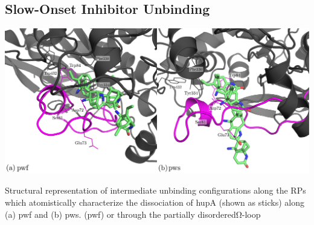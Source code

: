 \documentclass[a0,portrait]{a0poster}
\begin{document}
\begin{multicols}{2}
\section*{\huge\centering\color{myblue}Slow-Onset Inhibitor Unbinding~\cite{2}}
\vspace*{1cm}
\begin{minipage}[b]{\linewidth}
  \centering
  \includegraphics[width=38cm]{../fig/fig_6.pdf}
\end{minipage}

\noindent Structural representation of intermediate unbinding configurations along the RPs
which atomistically characterize the dissociation of hupA (shown as sticks)
along (a) pwf and (b) pws.  (pwf) or through the partially disorderedΩ-loop


\end{multicols}
\end{document}
